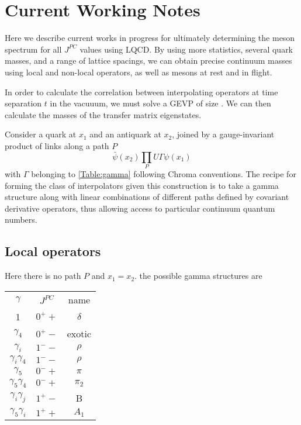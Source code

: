 
\chapter{Current Working Notes}\label{sec:current}

Here we describe current works in progress for ultimately determining the meson spectrum for all $J^{PC}$ values using LQCD. By using more statistics, several quark masses, and a range of lattice spacings, we can obtain precise continuum masses using local and non-local operators, as well as mesons at rest and in flight. 

In order to calculate the correlation between interpolating operators at time separation $t$ in the vacuuum, we must solve a GEVP of size . We can then calculate the masses of the transfer matrix eigenstates. 

Consider a quark at $x_1$ and an antiquark at $x_2$, joined by a gauge-invariant product of links along a path $P$ 
\begin{equation}
    \bar{\psi}(x_2) \prod_P U \Gamma \psi(x_1)
\end{equation}
with $\Gamma$ belonging to \cref{Table:gamma} following Chroma conventions. The recipe for forming the class of interpolators given this construction is to take a gamma structure along with linear combinations of different paths defined by covariant derivative operators, thus allowing access to particular continuum quantum numbers. 



\section{Local operators}
Here there is no path $P$ and $x_1=x_2$. 
the possible gamma structures are 
\begin{tabular}{c|c|c}
    $\gamma$ & $J^{PC}$ & name \\
    1 & $0^++$ & $\delta$ \\
    $\gamma_4$ & $0^+-$ & exotic \\
    $\gamma_i$ & $1^--$ & $\rho$ \\
    $\gamma_i \gamma_4$ & $1^--$ & $\rho$ \\
    $\gamma_5$ & $0^-+$ & $\pi$ \\
    $\gamma_5 \gamma_4$ & $0^-+$ & $\pi_2$ \\
    $\gamma_i \gamma_j$ & $1^+-$ & B \\
    $\gamma_5 \gamma_i$ & $1^++$ & $A_1$
\end{tabular}

